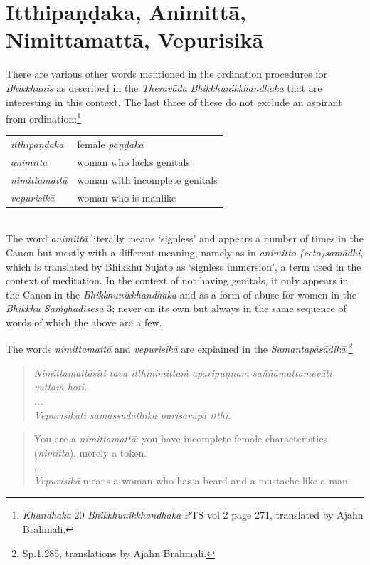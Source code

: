 \section{Itthipaṇḍaka, Animittā, Nimittamattā, Vepurisikā}
\label{itthipandaka}

There are various other words mentioned in the ordination procedures for \textit{Bhikkhunīs} as described in the \textit{Theravāda} \textit{Bhikkhunikkhandhaka} that are interesting in this context. The last three of these do not exclude an aspirant from ordination:\footnote{\textit{Khandhaka} 20 \textit{Bhikkhunikkhandhaka} PTS vol 2 page 271, translated by Ajahn Brahmali.} \\

\begin{tabular}{ l l }
 \textit{itthipaṇḍaka} & female \textit{paṇḍaka} \\
 \textit{animittā} & woman who lacks genitals \\
 \textit{nimittamattā} & woman with incomplete genitals \\ 
 \textit{vepurisikā} & woman who is manlike \\
\end{tabular} \\

The word \textit{animittā} literally means `signless' and appears a number of times in the Canon but mostly with a different meaning, namely as in \textit{animitto (ceto)samādhi}, which is translated by Bhikkhu Sujato as `signless immersion', a term used in the context of meditation. In the context of not having genitals, it only appears in the Canon in the \textit{Bhikkhunikkhandhaka} and as a form of abuse for women in the \textit{Bhikkhu Saṁ­ghā­di­sesa­} 3; never on its own but always in the same sequence of words of which the above are a few.

The words \textit{nimittamattā} and \textit{vepurisikā} are explained in the \textit{Samantapāsādikā}:\footnote{Sp.1.285, translations by Ajahn Brahmali.}
\begin{quote}
\textit{Nimittamattāsīti tava itthinimittaṁ aparipuṇṇaṁ saññāmattamevāti vuttaṁ hoti.\\
...\\
Vepurisikāti samassudāṭhikā purisarūpā itthī.}
\end{quote}

\begin{quote}
You are a \textit{nimittamattā}: you have incomplete female characteristics (\textit{nimitta}), merely a token.\\
...\\
\textit{Vepurisikā} means a woman who has a beard and a mustache like a man.
\end{quote}

